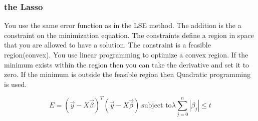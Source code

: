 \documentclass[letter, 9pt]{article}
\begin{document}
\subsubsection{the Lasso}
You use the same error function as in the LSE method. The addition is the a constraint on the minimization equation. The constraints define a region in space that you are allowed to have a solution. The constraint is a feasible region(convex). You use linear programming to optimize a convex region. If the minimum  exists within the region then you can take the derivative and set it to zero. If the minimum is outside the feasible region then Quadratic programming is used.

\begin{equation}
E = (\vec{y} - X\vec{\beta})^T(\vec{y} - X\vec{\beta})\
\text{subject to} \lambda \sum^{n}_{j=0}|\beta_j| \leq t
\end{equation}
\end{document}
